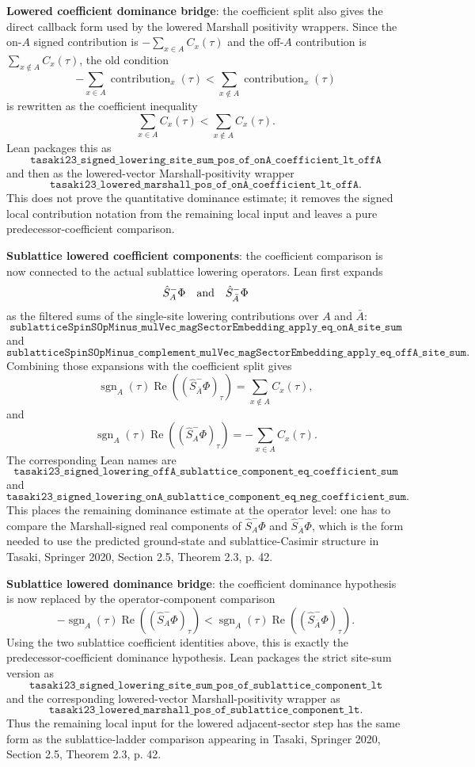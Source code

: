 \documentclass[a4paper,11pt]{article}
\begin{document}
\textbf{Lowered coefficient dominance bridge}: the coefficient split
also gives the direct callback form used by the lowered Marshall
positivity wrappers.  Since the on-\(A\) signed contribution is
\(-\sum_{x\in A}C_x(\tau)\) and the off-\(A\) contribution is
\(\sum_{x\notin A}C_x(\tau)\), the old condition
\[
  -\sum_{x\in A}\operatorname{contribution}_x(\tau)
  <
  \sum_{x\notin A}\operatorname{contribution}_x(\tau)
\]
is rewritten as the coefficient inequality
\[
  \sum_{x\in A} C_x(\tau)
  <
  \sum_{x\notin A} C_x(\tau).
\]
Lean packages this as
\[
\texttt{tasaki23\_signed\_lowering\_site\_sum\_pos\_of\_onA\_coefficient\_lt\_offA}
\]
and then as the lowered-vector Marshall-positivity wrapper
\[
\texttt{tasaki23\_lowered\_marshall\_pos\_of\_onA\_coefficient\_lt\_offA}.
\]
This does not prove the quantitative dominance estimate; it removes the
signed local contribution notation from the remaining local input and
leaves a pure predecessor-coefficient comparison.

\textbf{Sublattice lowered coefficient components}: the coefficient
comparison is now connected to the actual sublattice lowering
operators.  Lean first expands
\[
  \hat S_A^- \Phi
  \quad\hbox{and}\quad
  \hat S_{\bar A}^- \Phi
\]
as the filtered sums of the single-site lowering contributions over
\(A\) and \(\bar A\):
\[
\texttt{sublatticeSpinSOpMinus\_mulVec\_magSectorEmbedding\_apply\_eq\_onA\_site\_sum}
\]
and
\[
\texttt{sublatticeSpinSOpMinus\_complement\_mulVec\_magSectorEmbedding\_apply\_eq\_offA\_site\_sum}.
\]
Combining those expansions with the coefficient split gives
\[
  \operatorname{sgn}_A(\tau)
  \operatorname{Re}((\hat S_{\bar A}^- \Phi)_\tau)
  =
  \sum_{x\notin A} C_x(\tau),
\]
and
\[
  \operatorname{sgn}_A(\tau)
  \operatorname{Re}((\hat S_A^- \Phi)_\tau)
  =
  -\sum_{x\in A} C_x(\tau).
\]
The corresponding Lean names are
\[
\texttt{tasaki23\_signed\_lowering\_offA\_sublattice\_component\_eq\_coefficient\_sum}
\]
and
\[
\texttt{tasaki23\_signed\_lowering\_onA\_sublattice\_component\_eq\_neg\_coefficient\_sum}.
\]
This places the remaining dominance estimate at the operator level:
one has to compare the Marshall-signed real components of
\(\hat S_A^- \Phi\) and \(\hat S_{\bar A}^- \Phi\), which is the form
needed to use the predicted ground-state and sublattice-Casimir
structure in Tasaki, Springer 2020, Section 2.5, Theorem 2.3, p. 42.

\textbf{Sublattice lowered dominance bridge}: the coefficient
dominance hypothesis is now replaced by the operator-component
comparison
\[
  -\operatorname{sgn}_A(\tau)
  \operatorname{Re}((\hat S_A^- \Phi)_\tau)
  <
  \operatorname{sgn}_A(\tau)
  \operatorname{Re}((\hat S_{\bar A}^- \Phi)_\tau).
\]
Using the two sublattice coefficient identities above, this is exactly
the predecessor-coefficient dominance hypothesis.  Lean packages the
strict site-sum version as
\[
\texttt{tasaki23\_signed\_lowering\_site\_sum\_pos\_of\_sublattice\_component\_lt}
\]
and the corresponding lowered-vector Marshall-positivity wrapper as
\[
\texttt{tasaki23\_lowered\_marshall\_pos\_of\_sublattice\_component\_lt}.
\]
Thus the remaining local input for the lowered adjacent-sector step has
the same form as the sublattice-ladder comparison appearing in Tasaki,
Springer 2020, Section 2.5, Theorem 2.3, p. 42.
\end{document}

